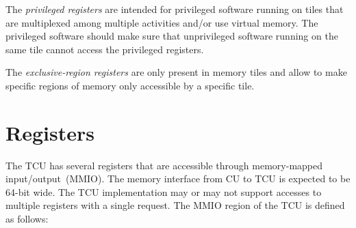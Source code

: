  The \emph{privileged registers} are intended for privileged software running on tiles
that are multiplexed among multiple activities and/or use virtual memory. The privileged software should
make sure that unprivileged software running on the same tile cannot access the privileged registers.
\extend{}

 The \emph{exclusive-region registers} are only present in memory tiles and allow
to make specific regions of memory only accessible by a specific tile.
\extend{}

\section{Registers}

The TCU has several registers that are accessible through memory-mapped input/output~(MMIO). The
memory interface from CU to TCU is expected to be 64-bit wide. The TCU implementation may or may not
support accesses to multiple registers with a single request. The MMIO region of the TCU is defined
as follows:

